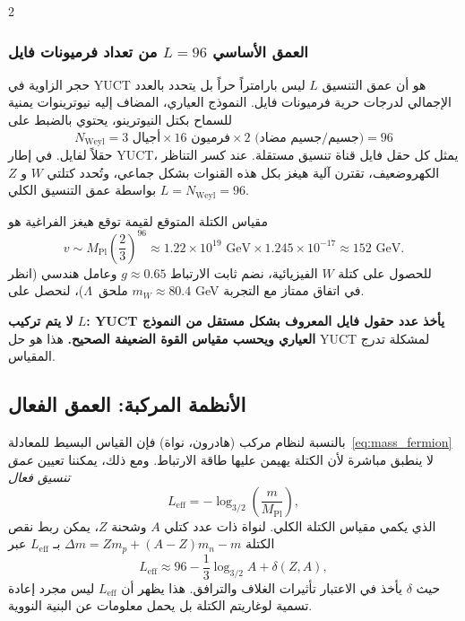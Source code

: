 \documentclass[11pt,a4paper]{article}
\begin{document}
\begin{multicols}{2}
		\subsubsection{العمق الأساسي $L=96$ من تعداد فرميونات فايل}
		
		حجر الزاوية في YUCT هو أن عمق التنسيق $L$ ليس بارامتراً حراً بل يتحدد بالعدد الإجمالي لدرجات حرية فرميونات فايل. النموذج العياري، المضاف إليه نيوترينوات يمنية للسماح بكتل النيوترينو، يحتوي بالضبط على
		\scriptsize
		\[
		N_{\text{Weyl}} = 3 \text{ أجيال} \times 16 \text{ فرميون} \times 2 \text{ (جسيم/جسيم مضاد)} = 96
		\]
		\small
		حقلاً لفايل. في إطار YUCT، يمثل كل حقل فايل قناة تنسيق مستقلة. عند كسر التناظر الكهروضعيف، تقترن آلية هيغز بكل هذه القنوات بشكل جماعي، وتُحدد كتلتي $W$ و $Z$ بواسطة عمق التنسيق الكلي $L = N_{\text{Weyl}} = 96$.
		
		مقياس الكتلة المتوقع لقيمة توقع هيغز الفراغية هو
		\begin{equation}
			v \sim M_{\mathrm{Pl}} \left( \frac{2}{3} \right)^{96} \approx 1.22 \times 10^{19} \text{ GeV} \times 1.245\times10^{-17} \approx 152 \text{ GeV}.
		\end{equation}
		للحصول على كتلة $W$ الفيزيائية، نضم ثابت الارتباط $g \approx 0.65$ وعامل هندسي (انظر ملحق~$\Lambda$)، لنحصل على $m_W \approx 80.4$ GeV في اتفاق ممتاز مع التجربة.
		
		\textbf{لا يتم تركيب $L$: YUCT يأخذ عدد حقول فايل المعروف بشكل مستقل من النموذج العياري ويحسب مقياس القوة الضعيفة الصحيح.} هذا هو حل YUCT لمشكلة تدرج المقياس.
		
		\subsection{الأنظمة المركبة: العمق الفعال}
		
		بالنسبة لنظام مركب (هادرون، نواة) فإن القياس البسيط للمعادلة~\eqref{eq:mass_fermion} لا ينطبق مباشرة لأن الكتلة يهيمن عليها طاقة الارتباط. ومع ذلك، يمكننا تعيين \emph{عمق تنسيق فعال}
		\begin{equation}
			L_{\mathrm{eff}} = -\log_{3/2}\left( \frac{m}{M_{\mathrm{Pl}}} \right),
			\label{eq:Leff}
		\end{equation}
		الذي يكمي مقياس الكتلة الكلي. لنواة ذات عدد كتلي \(A\) وشحنة \(Z\)، يمكن ربط نقص الكتلة \(\Delta m = Z m_p + (A-Z) m_n - m\) بـ \(L_{\mathrm{eff}}\) عبر
		\begin{equation}
			L_{\mathrm{eff}} \approx 96 - \frac{1}{3} \log_{3/2} A + \delta(Z,A),
		\end{equation}
		حيث \(\delta\) يأخذ في الاعتبار تأثيرات الغلاف والترافق. هذا يظهر أن \(L_{\mathrm{eff}}\) ليس مجرد إعادة تسمية لوغاريتم الكتلة بل يحمل معلومات عن البنية النووية.
		
	\end{multicols}
	
\end{document}
